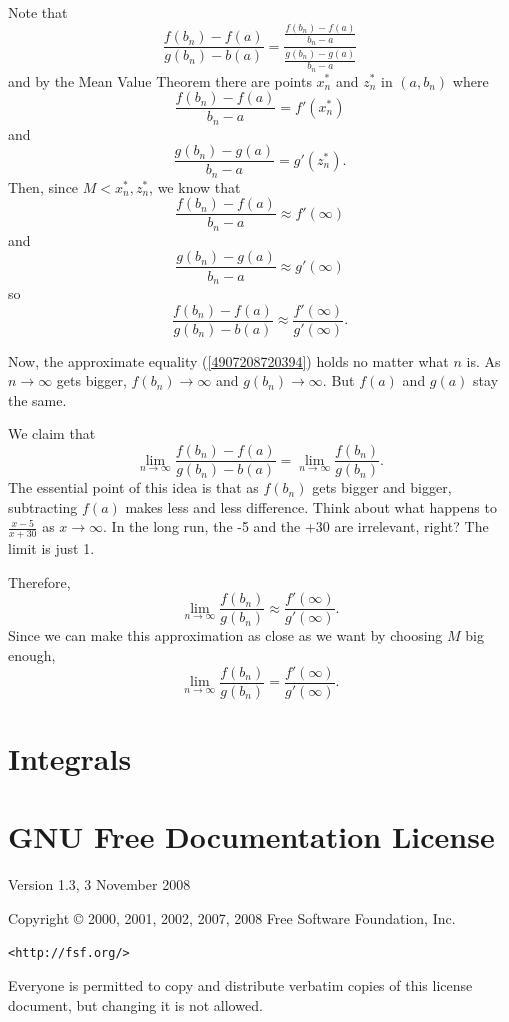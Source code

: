 \documentclass[11pt]{book}
\numberwithin{example}{chapter}
\begin{document}
Note that 
$$\frac{f(b_n)-f(a)}{g(b_n)-b(a)} = 
\frac{\frac{f(b_n)-f(a)}{b_n-a}}{\frac{g(b_n)-g(a)}{b_n-a}}$$
and by the Mean Value Theorem there are points $x^*_n$ and $z^*_n$ in $(a,b_n)$ where $$\frac{f(b_n)-f(a)}{b_n-a}=f'(x^*_n)$$
and 
$$\frac{g(b_n)-g(a)}{b_n-a}=g'(z^*_n).$$
Then, since $M<x^*_n,z^*_n$, we know that 
$$\frac{f(b_n)-f(a)}{b_n-a}\approx f'(\infty)$$
and 
$$\frac{g(b_n)-g(a)}{b_n-a}\approx g'(\infty)$$
so 
\begin{equation}\label{4907208720394}\frac{f(b_n)-f(a)}{g(b_n)-b(a)} \approx \frac{f'(\infty)}{g'(\infty)}.\end{equation}

Now, the approximate equality (\ref{4907208720394}) holds no matter what $n$ is.  As $n\to \infty$ gets bigger, $f(b_n)\to \infty$ and $g(b_n)\to\infty$.  But $f(a)$ and $g(a)$ stay the same.

We claim that $$\lim_{n\to \infty}\frac{f(b_n)-f(a)}{g(b_n)-b(a)} = \lim_{n\to \infty}\frac{f(b_n)}{g(b_n)}.$$
The essential point of this idea is that as $f(b_n)$ gets bigger and bigger, subtracting $f(a)$ makes less and less difference.  Think about what happens to $\frac{x-5}{x+30}$ as $x\to \infty$.  In the long run, the -5 and the +30 are irrelevant, right?  The limit is just 1. 

Therefore, $$ \lim_{n\to \infty}\frac{f(b_n)}{g(b_n)} \approx \frac{f'(\infty)}{g'(\infty)}.$$  
Since we can make this approximation as close as we want by choosing $M$ big enough, 
$$ \lim_{n\to \infty}\frac{f(b_n)}{g(b_n)} = \frac{f'(\infty)}{g'(\infty)}.$$




\chapter{Integrals}


\chapter*{GNU Free Documentation License}


 \begin{center}

       Version 1.3, 3 November 2008


 Copyright \copyright{} 2000, 2001, 2002, 2007, 2008  Free Software Foundation, Inc.
 
 \bigskip
 
     \texttt{<http://fsf.org/>}
  
 \bigskip
 
 Everyone is permitted to copy and distribute verbatim copies
 of this license document, but changing it is not allowed.
\end{center}
\end{document}

